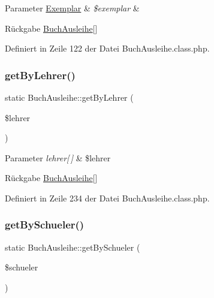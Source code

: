 \begin{DoxyParams}[1]{Parameter}
\mbox{\hyperlink{class_exemplar}{Exemplar}} & {\em \$exemplar} & \\
\hline
\end{DoxyParams}
\begin{DoxyReturn}{Rückgabe}
\mbox{\hyperlink{class_buch_ausleihe}{Buch\+Ausleihe}}\mbox{[}\mbox{]} 
\end{DoxyReturn}


Definiert in Zeile 122 der Datei Buch\+Ausleihe.\+class.\+php.

\mbox{\label{class_buch_ausleihe_a20ab3adc95e49c0fc50d04a895c3cb97}} 
\subsubsection{\texorpdfstring{get\+By\+Lehrer()}{getByLehrer()}}
{\footnotesize\ttfamily static Buch\+Ausleihe\+::get\+By\+Lehrer (\begin{DoxyParamCaption}\item[{}]{\$lehrer }\end{DoxyParamCaption})\hspace{0.3cm}{\ttfamily [static]}}


\begin{DoxyParams}{Parameter}
{\em lehrer\mbox{[}$\,$\mbox{]}} & \$lehrer \\
\hline
\end{DoxyParams}
\begin{DoxyReturn}{Rückgabe}
\mbox{\hyperlink{class_buch_ausleihe}{Buch\+Ausleihe}}\mbox{[}\mbox{]} 
\end{DoxyReturn}


Definiert in Zeile 234 der Datei Buch\+Ausleihe.\+class.\+php.

\mbox{\label{class_buch_ausleihe_a99d51b3d315ab0df97862b895940d441}} 
\subsubsection{\texorpdfstring{get\+By\+Schueler()}{getBySchueler()}}
{\footnotesize\ttfamily static Buch\+Ausleihe\+::get\+By\+Schueler (\begin{DoxyParamCaption}\item[{}]{\$schueler }\end{DoxyParamCaption})\hspace{0.3cm}{\ttfamily [static]}}


